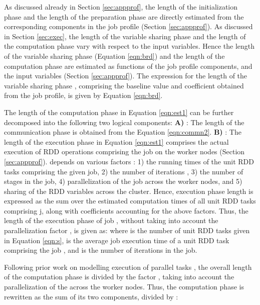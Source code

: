 \documentclass[conference]{IEEEtran}
\begin{document}
\par As discussed already in Section \ref{sec:appprof}, the length of the initialization phase  and the length of the
  preparation phase  are directly estimated from the corresponding components in the job
  profile (Section \ref{sec:appprof}). As discussed in Section \ref{sec:exec}, the length of the
  variable sharing phase  and the length of the computation phase 
  vary with respect to the input variables. Hence
  the length of the variable sharing phase  (Equation \ref{eqn:brd})
  and the length of the computation phase  are estimated as functions of the job profile components,
   and the input variables (Section
  \ref{sec:appprof}). The expression for the length of the variable sharing phase , comprising the baseline value
  and coefficient  obtained from the job profile, is  given by
  Equation \ref{eqn:brd}.
  \par The length of the computation phase  in Equation
  \ref{eqn:est1} can be further decomposed into the following two logical components:
\textbf{A)} \bm{}: The length of the communication phase  is obtained from the Equation \ref{eqn:commn2}. \textbf{B)} \bm{}: The length of the execution
 phase  in Equation \ref{eqn:est1} comprises the actual execution of  RDD operations
 comprising the job on the worker nodes (Section \ref{sec:appprof}).  depends on various factors \cite{Zaharia:2012:RDD:2228298.2228301}: 1) the running times of the unit RDD tasks
 comprising the given job, 2) the number of iterations , 3) the number of stages in the job,
 4) parallelization of  the job across the worker nodes, and 5) sharing of the RDD variables across the cluster. Hence, execution phase length  is expressed as the sum  over
 the estimated computation times of all unit RDD tasks comprising j, along with coefficients accounting for the
 above factors.
 Thus, the length of the execution phase  of job , without taking into account the parallelization factor , is given as: 
   where   is the number of unit RDD tasks given in Equation \ref{eqn:s},  is the average job execution
  time of a unit RDD task  comprising the job , and  is the number of iterations in the job.
\par Following prior work on modelling execution of parallel tasks \cite{Verma:2011:AAR:1998582.1998637}, the overall length of the computation phase  is divided by the factor , taking into account
  the parallelization of the  across the  worker nodes. Thus, the computation
  phase is rewritten as the sum of its two components, divided by :
  
\end{document}
